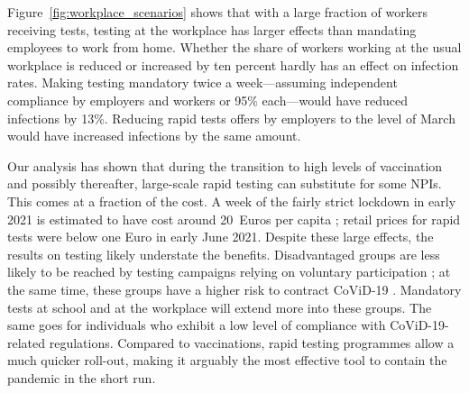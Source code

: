 Figure~\ref{fig:workplace_scenarios} shows that with a large fraction of workers
receiving tests, testing at the workplace has larger effects than mandating employees to
work from home. Whether the share of workers working at the usual workplace is reduced
or increased by ten percent hardly has an effect on infection rates. Making testing
mandatory twice a week---assuming independent compliance by employers and workers or
95\% each---would have reduced infections by 13\%. Reducing rapid tests offers by
employers to the level of March would have increased infections by the same amount.

Our analysis has shown that during the transition to high levels of vaccination and
possibly thereafter, large-scale rapid testing can substitute for some NPIs. This comes
at a fraction of the cost. A week of the fairly strict lockdown in early 2021 is
estimated to have cost around 20~Euros per capita \citep{Wollmershauser2021}; retail
prices for rapid tests were below one Euro in early June 2021. Despite these large
effects, the results on testing likely understate the benefits. Disadvantaged groups are
less likely to be reached by testing campaigns relying on voluntary participation
\citep[e.g.][]{StillmanTonin2021}; at the same time, these groups have a higher risk to
contract CoViD-19 \citep{KochInstitut2021a}. Mandatory tests at school and at the
workplace will extend more into these groups. The same goes for individuals who exhibit
a low level of compliance with CoViD-19-related regulations. Compared to vaccinations,
rapid testing programmes allow a much quicker roll-out, making it arguably the most
effective tool to contain the pandemic in the short run.
